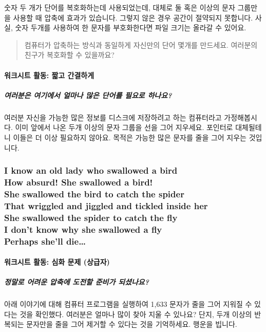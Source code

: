 \documentclass[]{article}
\begin{document}
숫자 두 개가 단어를 복호화하는데 사용되었는데, 대체로 둘 혹은 이상의
문자 그룹만을 사용할 때 압축에 효과가 있습니다. 그렇지 않은 경우 공간이
절약되지 못합니다. 사실, 숫자 두개를 사용하여 한 문자를 부호화한다면
파일 크기는 올라갈 수 있어요.

\begin{quote}
컴퓨터가 압축하는 방식과 동일하게 자신만의 단어 몇개를 만드세요.
여러분의 친구가 복호화할 수 있을까요?
\end{quote}

\mbox{}\paragraph{워크시트 활동: 짧고 간결하게}\label{section-54}

\subparagraph{여러분은 여기에서 얼마나 많은 단어를 필요로
하나요?}\label{section-55}

여러분 자신을 가능한 많은 정보를 디스크에 저장하려고 하는 컴퓨터라고
가정해봅시다. 이미 앞에서 나온 두개 이상의 문자 그룹을 선을 그어
지우세요. 포인터로 대체될테니 이들은 더 이상 필요하지 않아요. 목적은
가능한 많은 문자를 줄을 그어 지우는 것입니다.

\subsubsection{I know an old lady who swallowed a bird\\ How absurd! She
swallowed a bird!\\ She swallowed the bird to catch the spider\\ That
wriggled and jiggled and tickled inside her\\ She swallowed the spider
to catch the fly\\ I don't know why she swallowed a fly\\ Perhaps she'll
die\ldots{}}

\mbox{}\paragraph{워크시트 활동: 심화 문제 (상급자)}\label{section-56}

\subparagraph{정말로 어려운 압축에 도전할 준비가
되셨나요?}\label{section-57}

아래 이야기에 대해 컴퓨터 프로그램을 실행하여 1,633 문자가 줄을 그어
지워질 수 있다는 것을 확인했다. 여러분은 얼마나 많이 찾아 지울 수
있나요? 단지, 두개 이상의 반복되는 문자만을 줄을 그어 제거할 수 있다는
것을 기억하세요. 행운을 빕니다.
\end{document}
